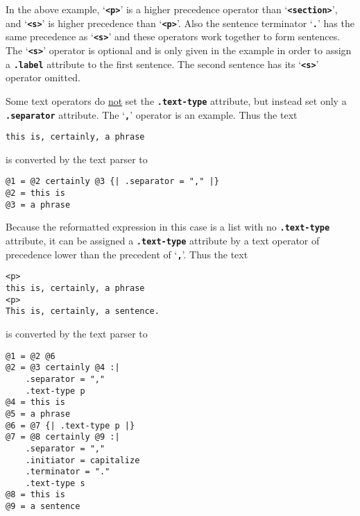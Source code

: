 \documentclass[12pt]{article}
\newcommand{\TT}[1]{{\tt \bfseries #1}}
\newenvironment{indpar}[1][0.3in]%
	{\begin{list}{}%
		     {\setlength{\itemsep}{0in}%
		      \setlength{\topsep}{0in}%
		      \setlength{\parsep}{1ex}%
		      \setlength{\labelwidth}{#1}%
		      \setlength{\leftmargin}{#1}%
		      \addtolength{\leftmargin}{\labelsep}}%
	 \item}%
	{\end{list}}
\begin{document}
In the above example,
`\TT{<p>}' is a higher precedence operator than `\TT{<section>}', and
`\TT{<s>}' is higher precedence than `\TT{<p>}'.  Also the sentence
terminator `\TT{.}' has the same precedence as `\TT{<s>}' and these
operators work together to form sentences.  The `\TT{<s>}' operator
is optional and is only given in the example in order to assign a \TT{.label}
attribute to the first sentence.  The second sentence has its `\TT{<s>}'
operator omitted.

Some text operators do \underline{not} set the \TT{.text-type} attribute,
but instead set only a \TT{.separator} attribute.  The `\TT{,}'
operator is an example.  Thus the text

\begin{indpar}\begin{verbatim}
this is, certainly, a phrase
\end{verbatim}\end{indpar}

is converted by the text parser to

\begin{indpar}\begin{verbatim}
@1 = @2 certainly @3 {| .separator = "," |}
@2 = this is
@3 = a phrase
\end{verbatim}\end{indpar}

Because the reformatted expression in this case is a list with
no \TT{.text-type} attribute, it can be assigned a \TT{.text-type}
attribute by a text operator of precedence lower than the
precedent of `\TT{,}'.  Thus the text

\begin{indpar}\begin{verbatim}
<p>
this is, certainly, a phrase
<p>
This is, certainly, a sentence.
\end{verbatim}\end{indpar}

is converted by the text parser to

\begin{indpar}\begin{verbatim}
@1 = @2 @6
@2 = @3 certainly @4 :|
    .separator = ","
    .text-type p
@4 = this is
@5 = a phrase
@6 = @7 {| .text-type p |}
@7 = @8 certainly @9 :|
    .separator = ","
    .initiator = capitalize
    .terminator = "."
    .text-type s
@8 = this is
@9 = a sentence
\end{verbatim}\end{indpar}
\end{document}
